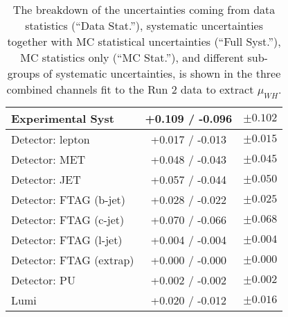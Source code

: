 \begin{table}[h]
\begin{tabular}{|l|c|c|}
Experimental Syst        & +0.109 / -0.096 & $ \pm 0.102 $ \\\hline
Detector: lepton         & +0.017 / -0.013 & $ \pm 0.015 $ \\
Detector: MET            & +0.048 / -0.043 & $ \pm 0.045 $ \\
Detector: JET            & +0.057 / -0.044 & $ \pm 0.050 $ \\
Detector: FTAG (b-jet)   & +0.028 / -0.022 & $ \pm 0.025 $ \\
Detector: FTAG (c-jet)   & +0.070 / -0.066 & $ \pm 0.068 $ \\
Detector: FTAG (l-jet)   & +0.004 / -0.004 & $ \pm 0.004 $ \\
Detector: FTAG (extrap)  & +0.000 / -0.000 & $ \pm 0.000 $ \\
Detector: PU             & +0.002 / -0.002 & $ \pm 0.002 $ \\
Lumi                     & +0.020 / -0.012 & $ \pm 0.016 $ \\
\hline\hline
\end{tabular}
\caption{The breakdown of the uncertainties coming from data statistics (``Data Stat.''), systematic uncertainties together with MC statistical uncertainties (``Full Syst.''), MC statistics only (``MC Stat.''), and different sub-groups of systematic uncertainties, is shown in the three combined channels fit to the Run 2 data to extract $\mu_{WH}$.}
 \label{tab:breakdown_012L_MVAWH}
\end{table}


